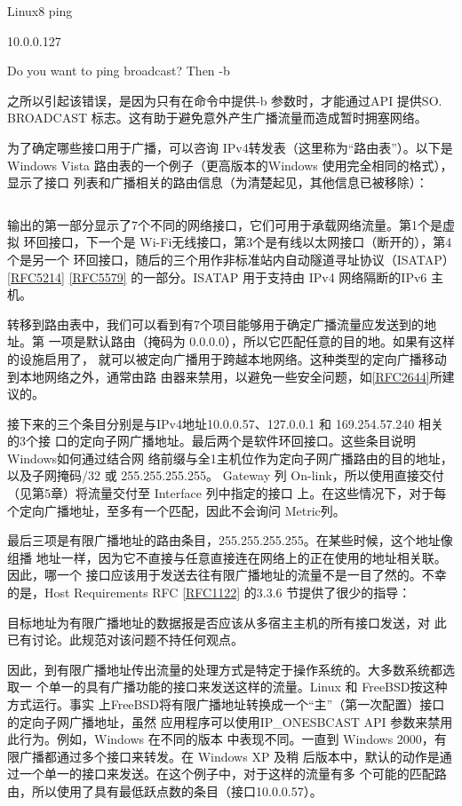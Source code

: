 Linux8 ping

10.0.0.127

Do you want to ping broadcast? Then -b

之所以引起该错误，是因为只有在命令中提供-b 参数时，才能通过API 提供SO.
BROADCAST
标志。这有助于避免意外产生广播流量而造成暂时拥塞网络。

为了确定哪些接口用于广播，可以咨询 IPv4转发表（这里称为“路由表”）。以下是
Windows Vista 路由表的一个例子（更高版本的Windows 使用完全相同的格式），显示了接口
列表和广播相关的路由信息（为清楚起见，其他信息已被移除）：

\begin{verbatim}

\end{verbatim}

输出的第一部分显示了7个不同的网络接口，它们可用于承载网络流量。第1个是虚拟
环回接口，下一个是 Wi-Fi无线接口，第3个是有线以太网接口（断开的），第4个是另一个
环回接口，随后的三个用作非标准站内自动隧道寻址协议（ISATAP）\href{https://www.rfc-editor.org/rfc/rfc5214}{[RFC5214]} \href{https://www.rfc-editor.org/rfc/rfc5579}{[RFC5579]}
的一部分。ISATAP 用于支持由 IPv4 网络隔断的IPv6 主机。

转移到路由表中，我们可以看到有7个项目能够用于确定广播流量应发送到的地址。第
一项是默认路由（掩码为 0.0.0.0），所以它匹配任意的目的地。如果有这样的设施启用了，
就可以被定向广播用于跨越本地网络。这种类型的定向广播移动到本地网络之外，通常由路
由器来禁用，以避免一些安全问题，如\href{https://www.rfc-editor.org/rfc/rfc2644}{[RFC2644]}所建议的。

接下来的三个条目分别是与IPv4地址10.0.0.57、127.0.0.1 和 169.254.57.240 相关的3个接
口的定向子网广播地址。最后两个是软件环回接口。这些条目说明Windows如何通过结合网
络前缀与全1主机位作为定向子网广播路由的目的地址，以及子网掩码/32 或 255.255.255.255。
Gateway 列 On-link，所以使用直接交付（见第5章）将流量交付至 Interface 列中指定的接口
上。在这些情况下，对于每个定向广播地址，至多有一个匹配，因此不会询问 Metric列。

最后三项是有限广播地址的路由条目，255.255.255.255。在某些时候，这个地址像组播
地址一样，因为它不直接与任意直接连在网络上的正在使用的地址相关联。因此，哪一个
接口应该用于发送去往有限广播地址的流量不是一目了然的。不幸的是，Host Requirements
RFC \href{https://www.rfc-editor.org/rfc/rfc1122}{[RFC1122]} 的3.3.6 节提供了很少的指导：

目标地址为有限广播地址的数据报是否应该从多宿主主机的所有接口发送，对
此已有讨论。此规范对该问题不持任何观点。

因此，到有限广播地址传出流量的处理方式是特定于操作系统的。大多数系统都选取一
个单一的具有广播功能的接口来发送这样的流量。Linux 和 FreeBSD按这种方式运行。事实
上FreeBSD将有限广播地址转换成一个“主”（第一次配置）接口的定向子网广播地址，虽然
应用程序可以使用IP\_ONESBCAST API 参数来禁用此行为。例如，Windows 在不同的版本
中表现不同。一直到 Windows 2000，有限广播都通过多个接口来转发。在 Windows XP 及稍
后版本中，默认的动作是通过一个单一的接口来发送。在这个例子中，对于这样的流量有多
个可能的匹配路由，所以使用了具有最低跃点数的条目（接口10.0.0.57）。


